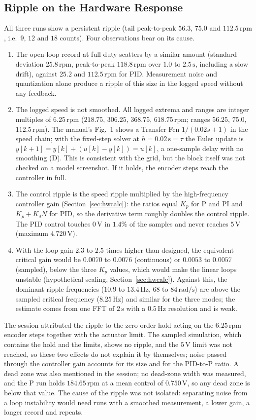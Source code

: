 \documentclass[lettersize,journal]{IEEEtran}
\newcommand{\code}[1]{\texttt{\detokenize{#1}}}
\newcommand{\rpm}{\,\text{rpm}}
\begin{document}
\subsection{Ripple on the Hardware Response}
\label{sec:ripple}
All three runs show a persistent ripple (tail peak-to-peak $56.3$, $75.0$ and $112.5\rpm$, i.e.\ $9$, $12$ and $18$ counts). Four observations bear on its cause.
\begin{enumerate}
\item The open-loop record at full duty scatters by a similar amount (standard deviation $25.8\rpm$, peak-to-peak $118.8\rpm$ over $1.0$ to $2.5\,\text{s}$, including a slow drift), against $25.2$ and $112.5\rpm$ for PID. Measurement noise and quantization alone produce a ripple of this size in the logged speed without any feedback.
\item The logged speed is not smoothed. All logged extrema and ranges are integer multiples of $6.25\rpm$ ($218.75$, $306.25$, $368.75$, $618.75\rpm$; ranges $56.25$, $75.0$, $112.5\rpm$). The manual's Fig.~1 shows a Transfer Fcn $1/(0.02s+1)$ in the speed chain; with the fixed-step solver \code{ode1} at $h=0.02\,\text{s}=\tau$ the Euler update is $y[k+1]=y[k]+(u[k]-y[k])=u[k]$, a one-sample delay with no smoothing (D). This is consistent with the grid, but the block itself was not checked on a model screenshot. If it holds, the encoder steps reach the controller in full.
\item The control ripple is the speed ripple multiplied by the high-frequency controller gain (Section~\ref{sec:hwcalc}): the ratios equal $K_p$ for P and PI and $K_p+K_dN$ for PID, so the derivative term roughly doubles the control ripple. The PID control touches $0\,\text{V}$ in $1.4\%$ of the samples and never reaches $5\,\text{V}$ (maximum $4.720\,\text{V}$).
\item With the loop gain $2.3$ to $2.5$ times higher than designed, the equivalent critical gain would be $0.0070$ to $0.0076$ (continuous) or $0.0053$ to $0.0057$ (sampled), below the three $K_p$ values, which would make the linear loops unstable (hypothetical scaling, Section~\ref{sec:hwcalc}). Against this, the dominant ripple frequencies ($10.9$ to $13.4\,\text{Hz}$, $68$ to $84\,\text{rad/s}$) are above the sampled critical frequency ($8.25\,\text{Hz}$) and similar for the three modes; the estimate comes from one FFT of $2\,\text{s}$ with a $0.5\,\text{Hz}$ resolution and is weak.
\end{enumerate}
The session attributed the ripple to the zero-order hold acting on the $6.25\rpm$ encoder steps together with the actuator limit. The sampled simulation, which contains the hold and the limits, shows no ripple, and the $5\,\text{V}$ limit was not reached, so these two effects do not explain it by themselves; noise passed through the controller gain accounts for its size and for the PID-to-P ratio. A dead zone was also mentioned in the session; no dead-zone width was measured, and the P run holds $184.65\rpm$ at a mean control of $0.750\,\text{V}$, so any dead zone is below that value. The cause of the ripple was not isolated: separating noise from a loop instability would need runs with a smoothed measurement, a lower gain, a longer record and repeats.
\end{document}
